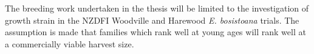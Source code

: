 The breeding work undertaken in the thesis will be limited to the investigation
of growth strain in the NZDFI Woodville and Harewood \textit{E. bosistoana}
trials. The assumption is made that families which rank well at young ages will rank well at a commercially viable harvest size.